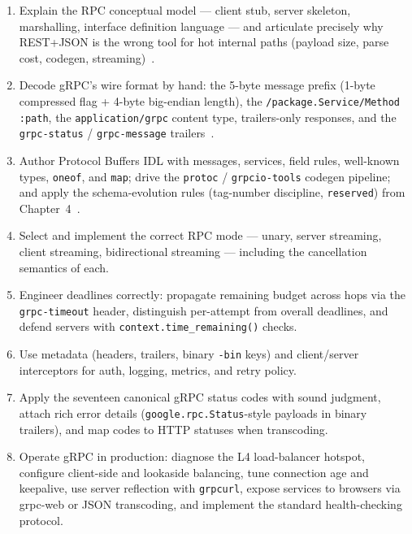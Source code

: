 \begin{enumerate}[label=\textbf{LO-\arabic*.}, leftmargin=2.6cm]
  \item Explain the RPC conceptual model --- client stub, server skeleton,
        marshalling, interface definition language --- and articulate precisely why
        REST+JSON is the wrong tool for hot internal paths (payload size, parse
        cost, codegen, streaming)~\cite{kleppmann2017ddia,newman2021microservices}.
  \item Decode gRPC's wire format by hand: the 5-byte message prefix (1-byte
        compressed flag + 4-byte big-endian length), the
        \texttt{/package.Service/Method} \texttt{:path}, the
        \texttt{application/grpc} content type, trailers-only responses, and the
        \texttt{grpc-status} / \texttt{grpc-message} trailers~\cite{rfc9113,grpcdocs}.
  \item Author Protocol Buffers IDL with messages, services, field rules,
        well-known types, \texttt{oneof}, and \texttt{map}; drive the
        \texttt{protoc} / \texttt{grpcio-tools} codegen pipeline; and apply the
        schema-evolution rules (tag-number discipline, \texttt{reserved}) from
        Chapter~4~\cite{protobufdocs}.
  \item Select and implement the correct RPC mode --- unary, server streaming,
        client streaming, bidirectional streaming --- including the cancellation
        semantics of each.
  \item Engineer deadlines correctly: propagate remaining budget across hops via
        the \texttt{grpc-timeout} header, distinguish per-attempt from overall
        deadlines, and defend servers with \texttt{context.time\_remaining()}
        checks.
  \item Use metadata (headers, trailers, binary \texttt{-bin} keys) and
        client/server interceptors for auth, logging, metrics, and retry policy.
  \item Apply the seventeen canonical gRPC status codes with sound judgment,
        attach rich error details (\texttt{google.rpc.Status}-style payloads in
        binary trailers), and map codes to HTTP statuses when transcoding.
  \item Operate gRPC in production: diagnose the L4 load-balancer hotspot,
        configure client-side and lookaside balancing, tune connection age and
        keepalive, use server reflection with \texttt{grpcurl}, expose services
        to browsers via grpc-web or JSON transcoding, and implement the standard
        health-checking protocol.
\end{enumerate}

